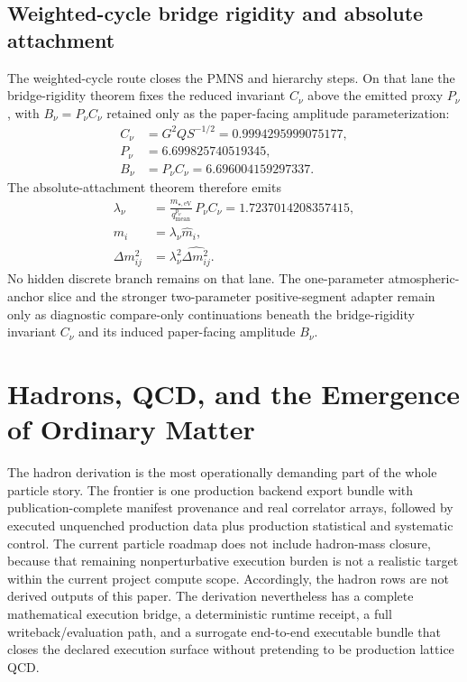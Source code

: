 \documentclass[11pt]{article}
\begin{document}
\subsection{Weighted-cycle bridge rigidity and absolute attachment}

The weighted-cycle route closes the PMNS and hierarchy steps. On that lane the
bridge-rigidity theorem fixes the reduced invariant \(C_\nu\) above the emitted
proxy \(P_\nu\), with \(B_\nu=P_\nu C_\nu\) retained only as the paper-facing
amplitude parameterization:
\[
\begin{aligned}
C_\nu&=G^2Q S^{-1/2}=0.9994295999075177,\\
P_\nu&=6.699825740519345,\\
B_\nu&=P_\nu C_\nu=6.696004159297337.
\end{aligned}
\]
The absolute-attachment theorem therefore emits
\[
\begin{aligned}
\lambda_\nu&=\frac{m_{\star,\mathrm{eV}}}{q_{\mathrm{mean}}^{p_\nu}}\,P_\nu C_\nu=1.7237014208357415,\\
m_i&=\lambda_\nu \hat m_i,\\
\Delta m_{ij}^2&=\lambda_\nu^2\widehat{\Delta m_{ij}^2}.
\end{aligned}
\]
No hidden discrete branch remains on that lane. The one-parameter atmospheric-anchor slice and
the stronger two-parameter positive-segment adapter remain only as diagnostic compare-only
continuations beneath the bridge-rigidity invariant \(C_\nu\) and its induced paper-facing amplitude \(B_\nu\).

\section{Hadrons, QCD, and the Emergence of Ordinary Matter}

The hadron derivation is the most operationally demanding part of the whole particle story. The
frontier is one production backend export bundle with publication-complete manifest provenance and real correlator arrays, followed by executed unquenched production data plus
production statistical and systematic control. The current particle roadmap does not include hadron-mass closure, because that remaining nonperturbative execution burden is not a realistic target within the current project compute scope. Accordingly, the hadron rows are not
derived outputs of this paper. The derivation nevertheless has a complete
mathematical execution bridge, a deterministic runtime receipt, a full writeback/evaluation path,
and a surrogate end-to-end executable bundle that closes the declared execution surface without
pretending to be production lattice QCD.
\end{document}
